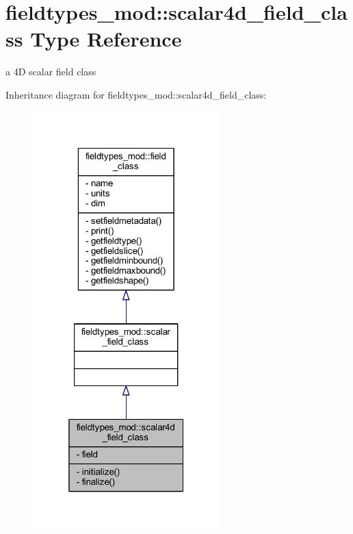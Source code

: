 \hypertarget{structfieldtypes__mod_1_1scalar4d__field__class}{}\section{fieldtypes\+\_\+mod\+:\+:scalar4d\+\_\+field\+\_\+class Type Reference}
\label{structfieldtypes__mod_1_1scalar4d__field__class}


a 4D scalar field class  




Inheritance diagram for fieldtypes\+\_\+mod\+:\+:scalar4d\+\_\+field\+\_\+class\+:\nopagebreak
\begin{figure}[H]
\begin{center}
\leavevmode
\includegraphics[width=205pt]{structfieldtypes__mod_1_1scalar4d__field__class__inherit__graph}
\end{center}
\end{figure}


